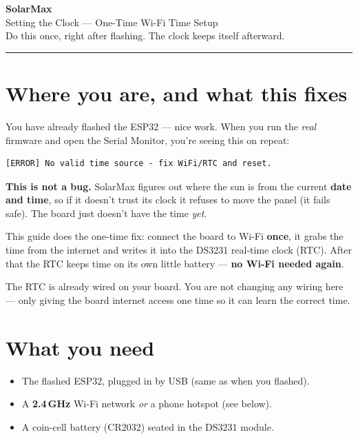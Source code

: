 \documentclass[11pt]{article}
\begin{document}
\begin{center}
{\Huge\bfseries\color{brandblue} SolarMax}\\[4pt]
{\LARGE Setting the Clock --- One-Time Wi-Fi Time Setup}\\[8pt]
{\large Do this once, right after flashing. The clock keeps itself afterward.}\\[6pt]
\rule{0.9\linewidth}{0.8pt}
\end{center}

\vspace{4pt}
\tableofcontents
\vspace{8pt}

\section{Where you are, and what this fixes}
You have already flashed the ESP32 --- nice work. When you run the \emph{real}
firmware and open the Serial Monitor, you're seeing this on repeat:
\begin{lstlisting}
[ERROR] No valid time source - fix WiFi/RTC and reset.
\end{lstlisting}

\textbf{This is not a bug.} SolarMax figures out where the sun is from the current
\textbf{date and time}, so if it doesn't trust its clock it refuses to move the panel
(it fails safe). The board just doesn't have the time \emph{yet}.

This guide does the one-time fix: connect the board to Wi-Fi \textbf{once}, it grabs
the time from the internet and writes it into the DS3231 real-time clock (RTC). After
that the RTC keeps time on its own little battery --- \textbf{no Wi-Fi needed again}.

\begin{note}
The RTC is already wired on your board. You are not changing any wiring here ---
only giving the board internet access one time so it can learn the correct time.
\end{note}

\section{What you need}
\begin{itemize}[leftmargin=1.6em]
  \item The flashed ESP32, plugged in by USB (same as when you flashed).
  \item A \textbf{2.4\,GHz} Wi-Fi network \emph{or} a phone hotspot (see below).
  \item A coin-cell battery (CR2032) seated in the DS3231 module.
\end{itemize}
\end{document}
